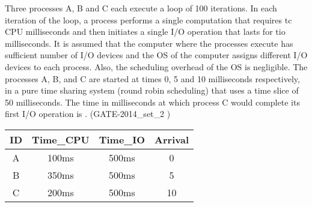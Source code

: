 \begin{questyle}

  \question Three processes A, B and C each execute a loop of 100 iterations. In each iteration of the
            loop, a process performs a single computation that requires tc CPU milliseconds and then initiates
            a single I/O operation that lasts for tio milliseconds. It is assumed that the computer where the
            processes execute has sufficient number of I/O devices and the OS of the computer assigns
            different I/O devices to each process. Also, the scheduling overhead of the OS is negligible.
            The processes A, B, and C are started at times 0, 5 and 10 milliseconds respectively, in a pure
            time sharing system (round robin scheduling) that uses a time slice of 50 milliseconds. The time
            in milliseconds at which process C would complete its first I/O operation is \fillin[1000]. (GATE-2014\_set\_2 )

  \begin{myTableStyle}
    \begin{center}
    \begin{tabular}{ |c|c|c|c| } \hline
          ID & Time\_CPU & Time\_IO  & Arrival \\ \hline
          A & 100ms & 500ms & 0 \\ \hline
          B & 350ms & 500ms & 5 \\ \hline
          C & 200ms & 500ms & 10 \\ \hline
    \end{tabular}
    \end{center}
  \end{myTableStyle}
  \vspace{0.08in}

  \end{questyle}


